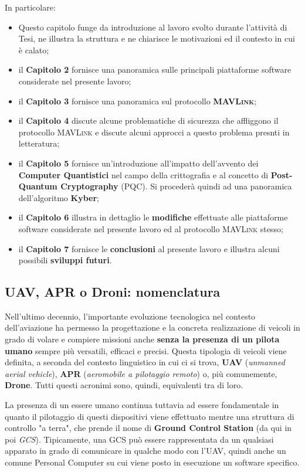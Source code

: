 \documentclass[a4paper, 12pt, oneside]{article}
\theoremstyle{definition}
\begin{document}
In particolare:

\begin{itemize}
    \item Questo capitolo funge da introduzione al lavoro svolto durante l'attività di Tesi, ne illustra la struttura e ne chiarisce le motivazioni ed il contesto in cui è calato;
    \item il \textbf{Capitolo 2} fornisce una panoramica sulle principali piattaforme software considerate nel presente lavoro;
    \item il \textbf{Capitolo 3} fornisce una panoramica sul protocollo \textbf{\textsc{MAVLink}};
    \item il \textbf{Capitolo 4} discute alcune problematiche di sicurezza che affliggono il protocollo \textsc{MAVLink} e discute alcuni approcci a questo problema presnti in letteratura;
    \item il \textbf{Capitolo 5} fornisce un'introduzione all'impatto dell'avvento dei \textbf{Computer Quantistici} nel campo della crittografia e al concetto di \textbf{Post-Quantum Cryptography} (PQC). Si procederà quindi ad una panoramica dell'algoritmo \textbf{Kyber};
    \item il \textbf{Capitolo 6} illustra in dettaglio le \textbf{modifiche} effettuate alle piattaforme software considerate nel presente lavoro ed al protocollo \textsc{MAVLink} stesso;
    \item il \textbf{Capitolo 7} fornisce le \textbf{conclusioni} al presente lavoro e illustra alcuni possibili \textbf{sviluppi futuri}.
\end{itemize}

\newpage


\subsection{UAV, APR o Droni: nomenclatura}
Nell'ultimo decennio, l'importante evoluzione tecnologica nel contesto dell'aviazione ha permesso la progettazione e la concreta realizzazione di veicoli in grado di volare e compiere missioni anche \textbf{senza la presenza di un pilota umano} sempre più versatili, efficaci e precisi. Questa tipologia di veicoli viene definita, a seconda del contesto linguistico in cui ci si trova, \textbf{UAV} (\textit{unmanned aerial vehicle}), \textbf{APR} (\textit{aeromobile a pilotaggio remoto}) o, più comunemente, \textbf{Drone}. Tutti questi acronimi sono, quindi, equivalenti tra di loro. 

La presenza di un essere umano continua tuttavia ad essere fondamentale in quanto il pilotaggio di questi dispositivi viene effettuato mentre una struttura di controllo "a terra", che prende il nome di \textbf{Ground Control Station} (da qui in poi \textit{GCS}). Tipicamente, una GCS può essere rappresentata da un qualsiasi apparato in grado di comunicare in qualche modo con l'UAV, quindi anche un comune Personal Computer su cui viene posto in esecuzione un software specifico.
\end{document}
